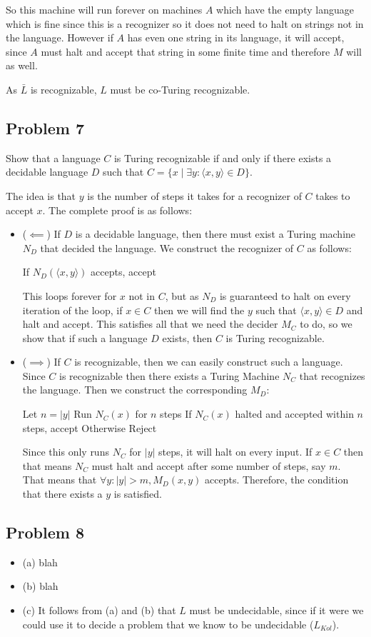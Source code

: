 \documentclass[english]{article}
\begin{document}
So this machine will run forever on machines $A$ which have the empty language
which is fine since this is a recognizer so it does not need to halt on 
strings not in the language. However if $A$ has even one string in its
language, it will accept, since $A$ must halt and accept that string in some
finite time and therefore $M$ will as well.

As $\bar{L}$ is recognizable, $L$ must be co-Turing recognizable. 

\subsection*{Problem 7}
Show that a language $C$ is Turing recognizable if and only if there exists a 
decidable language $D$ such that
$C = \{ x \mid \exists y : \langle x, y \rangle \in D\}$.

The idea is that $y$ is the number of steps it takes for a recognizer of $C$
takes to accept $x$. The complete proof is as follows:
\begin{itemize}
\item ($ \impliedby $) If $D$ is a decidable language, then there must exist
	a Turing machine $N_D$ that decided the language. We construct the
	recognizer of $C$ as follows:
\begin{algorithmic}
		\State If $N_D(\langle x, y \rangle)$ accepts, accept 
	\EndFor 
\EndFunction
\end{algorithmic}

This loops forever for $x$ not in $C$, but as $N_D$ is guaranteed to halt
on every iteration of the loop, if $x \in C$ then we will find the $y$
such that $\langle x,y \rangle \in D$ and halt and accept. This satisfies
all that we need the decider $M_C$ to do, so we show that if such a
language $D$ exists, then $C$ is Turing recognizable.

\item ($ \implies $) If $C$ is recognizable, then we can easily construct
	such a language. Since $C$ is recognizable then there exists a
	Turing Machine $N_C$ that recognizes the language. Then we construct
	the corresponding $M_D$:
\begin{algorithmic}
	\State Let $n = |y|$
	\State Run $N_C(x)$ for $n$ steps
	\State If $N_C(x)$ halted and accepted within $n$ steps, accept
	\State Otherwise Reject
\EndFunction
\end{algorithmic}

Since this only runs $N_C$ for $|y|$ steps, it will halt on every input. If
$x \in C$ then that means $N_C$ must halt and accept after some number of 
steps, say $m$. That means that $\forall y : |y| > m, M_D(x,y)$ accepts. 
Therefore, the condition that there exists a $y$ is satisfied.
\end{itemize}

\subsection*{Problem 8}
\begin{itemize}
\item (a) blah
\item (b) blah
\item (c) It follows from (a) and (b) that $L$ must be undecidable, since if
  it were we could use it to decide a problem that we know to be undecidable
  ($L_{Kol}$).
\end{itemize}
\end{document}
